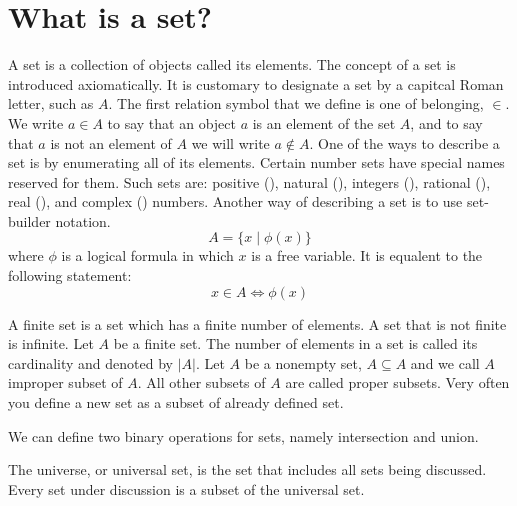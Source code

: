\documentclass[letterpaper, 10pt]{article}
\newcommand{\set}[1]{\{#1\}}
\newcommand{\card}[1]{\lvert #1 \rvert}
\begin{document}
	\section{What is a set?}
	A set is a collection of objects called its elements. The concept of a set
	is introduced axiomatically. It is customary to designate a set by a
	capitcal Roman letter, such as $A$. The first relation symbol that we define
	is one of belonging, $\in$. We write $a\in A$ to say that an object $a$ is
	an element of the set $A$, and to say that $a$ is not an element of $A$ we
	will write $a\not\in A$.
	One of the ways to describe a set is by enumerating all of its elements.
	Certain number sets have special names reserved for them. Such sets are:
	positive (), natural (), integers (), rational
	(), real (), and complex () numbers.
	Another way of describing a set is to use set-builder notation.
	$$
	A = \set{x\mid \phi(x)}
	$$
	where $\phi$ is a logical formula in which $x$ is a free variable. It is
	equalent to the following statement:
	$$
	x \in A \iff \phi(x)
	$$

	A finite set is a set which has a finite number of elements. A set that is
	not finite is infinite.
	Let $A$ be a finite set. The number of elements in a set is called its
	cardinality and denoted by $\card{A}$.
	Let $A$ be a nonempty set, $A\subseteq A$ and we call $A$ improper subset of
	$A$. All other subsets of $A$ are called proper subsets. 
	Very often you define a new set as a subset of already defined set.

	We can define two binary operations for sets, namely intersection and union.

	The universe, or universal set, is the set that includes all sets being
	discussed. Every set under discussion is a subset of the universal set.
\end{document}
